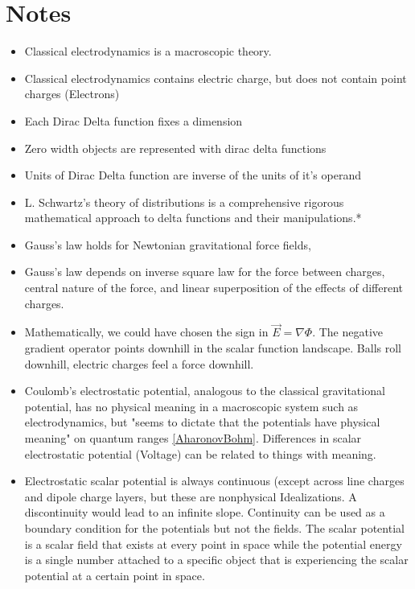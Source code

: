 \documentclass[12pt]{article}
\begin{document}
    

\section{Notes}
\begin{itemize}
  \item Classical electrodynamics is a macroscopic theory.
  \item Classical electrodynamics contains electric charge, but does not contain point charges (Electrons)
  \item Each Dirac Delta function fixes a dimension
  \item Zero width objects are represented with dirac delta functions
  \item Units of Dirac Delta function are inverse of the units of it's operand
  \item L. Schwartz’s theory of distributions is a comprehensive rigorous mathematical approach to delta functions and their manipulations.*
  \item Gauss’s law holds for Newtonian gravitational force fields,
  \item Gauss's law depends on inverse square law for the force between charges, central nature of the force, and linear superposition of the effects of different charges. 
  \item Mathematically, we could have chosen the sign in $\vec{E} = \nabla \Phi$. The negative gradient operator points downhill in the scalar function landscape. Balls roll downhill, electric charges feel a force downhill.
  \item Coulomb's electrostatic potential, analogous to the classical gravitational potential, has no physical meaning in a macroscopic system such as electrodynamics, but "seems to dictate that the potentials have physical meaning" on quantum ranges \ref{AharonovBohm}. Differences in scalar electrostatic potential (Voltage) can be related to things with meaning.%
  \item Electrostatic scalar potential is always continuous (except across line charges and dipole charge layers, but these are nonphysical Idealizations. A discontinuity would lead to an infinite slope. Continuity can be used as a boundary condition for the potentials but not the fields. The scalar potential is a scalar field that exists at every point in space while the potential energy is a single number attached to a specific object that is experiencing the scalar potential at a certain point in space.
\end{itemize}
\end{document}
